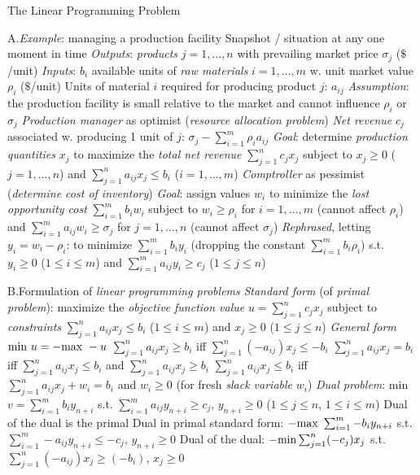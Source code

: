 \beginsection The Linear Programming Problem

\item{A.}\emph{Example}: managing a production facility\smallskip
{}Snapshot / situation at any one moment in time\smallskip
{}\emph{Outputs}: \emph{products} $j=1,\ldots,n$ with prevailing
market price $\sigma_j$ ($\$$/unit) \smallskip
{}\emph{Inputs}: $b_i$ available units of \emph{raw materials} $i=1,
\ldots,m$ w. unit market value $\rho_i$ ($\$$/unit)\smallskip
{}Units of material $i$ required for producing product $j$: $a_{ij}$
\smallskip
{}\emph{Assumption}: the production facility is small relative to the
market and cannot influence $\rho_i$ or $\sigma_j$\smallskip
{}\emph{Production manager} as optimist (\emph{resource allocation
problem})\smallskip
{}\emph{Net revenue} $c_j$ associated w. producing 1 unit of $j$:
$\sigma_j-\sum_{i=1}^m\rho_ia_{ij}$\smallskip
{}\emph{Goal}: determine \emph{production quantities} $x_j$ to
maximize the \emph{total net revenue} $\sum_{j=1}^nc_jx_j$ subject to
$x_j\geq 0$ ($j=1,\ldots,n$) and $\sum_{j=1}^na_{ij}x_j\leq b_i$ ($i=1,\ldots,
m$)\smallskip
{}\emph{Comptroller} as pessimist (\emph{determine cost of inventory})
\smallskip
{}\emph{Goal}: assign values $w_i$ to minimize the \emph{lost
opportunity cost} $\sum_{i=1}^mb_iw_i$ subject to $w_i\geq\rho_i$ for $i=1,
\ldots,m$ (cannot affect $\rho_i$) and $\sum_{i=1}^ma_{ij}w_i\geq\sigma_j$ for
$j=1,\ldots,n$ (cannot affect $\sigma_j$)\smallskip
{}\emph{Rephrased}, letting $y_i=w_i-\rho_i$: to minimize 
$\sum_{i=1}^mb_iy_i$ (dropping the constant $\sum_{i=1}^mb_i\rho_i$) s.t.
$y_i\geq 0$ ($1\leq i\leq m$) and $\sum_{i=1}^ma_{ij}y_i\geq c_j$ ($1\leq j\leq
n$)\smallskip

\item{B.}Formulation of \emph{linear programming problems}\smallskip
{}\emph{Standard form} (of \emph{primal problem}): maximize
the \emph{objective function value} $u=\sum_{j=1}^nc_{j}x_j$ subject to
\emph{constraints} $\sum_{j=1}^na_{ij}x_j\leq b_i$
($1\leq i\leq m$) and $x_j\geq 0$ ($1\leq j\leq n$)\smallskip
{}\emph{General form}\smallskip
{}${\rm min}\ u=-{\rm max}\ -u$\smallskip
{}$\sum_{j=1}^na_{ij}x_j\geq b_i$ iff $\sum_{j=1}^n(-a_{ij})x_j\leq
-b_i$\smallskip
{}$\sum_{j=1}^na_{ij}x_j=b_i$ iff $\sum_{j=1}^na_{ij}x_j\leq b_i$ and
$\sum_{j=1}^na_{ij}x_j\geq b_i$\smallskip
{}$\sum_{j=1}^na_{ij}x_j\leq b_i$ iff $\sum_{j=1}^na_{ij}x_j+w_i=b_i$
and $w_i\geq 0$ (for fresh \emph{slack variable} $w_i$)\smallskip
{}\emph{Dual problem}: min $v=\sum_{i=1}^mb_iy_{n+i}$
s.t. $\sum_{i=1}^ma_{ij}y_{n+i}\geq c_j$, $y_{n+i}\geq 0$ ($1\leq j\leq n$, $1\leq i
\leq m$)\smallskip
{}Dual of the dual is the primal\smallskip
{}Dual in primal standard form: $-{\rm max}\ \sum_{i=1}^m-b_iy_{n+i}$
s.t. $\sum_{i=1}^m-a_{ij}y_{n+i}\leq-c_j$, $y_{n+i}\geq 0$\smallskip
{}Dual of the dual: $-{\rm min}\sum_{j=1}^n(-c_j)x_j$ s.t.
$\sum_{j=1}^n(-a_{ij})x_j\geq(-b_i)$, $x_j\geq 0$\smallskip

